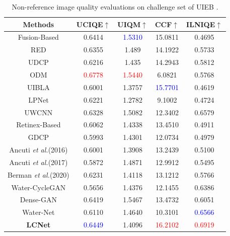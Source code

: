 \documentclass[journal]{IEEEtran}
\begin{document}
\begin{table}[h]
 \caption{Non-reference image quality evaluations on challenge set of UIEB \cite{water-net}. }
\centering

\begin{tabular}{|c|c|c|c|c|} 
\hline 
Methods&UCIQE\(\uparrow\)&UIQM\(\uparrow\)&CCF\(\uparrow\)&ILNIQE\(\uparrow\)\\
\hline
Fusion-Based \cite{fusion-based}&0.6414&\textcolor{blue}{1.5310}&15.0811&0.4695 \\
\hline
RED \cite{RED} &0.6355&1.489&14.1922&0.5733 \\
\hline 
UDCP \cite{UDCP} &0.6216&1.435&14.2943&0.5812 \\
\hline 
ODM \cite{Histogram-prior} &\textcolor{red}{0.6778}&\textcolor{red}{1.5440}&6.0821&0.5768\\
\hline
UIBLA \cite{blurriness-based} &0.6001&1.3757&\textcolor{blue}{15.7701}&0.4619\\
\hline
LPNet \cite{fu2019lightweight} &0.6221&1.2782&9.1002&0.4724\\
\hline
UWCNN \cite{uwcnn} &0.6328&1.5082&12.3402&0.6579\\
\hline
Retinex-Based \cite{fu2014retinex} &0.6062&1.4338&13.4510&0.4911\\
\hline
GDCP \cite{GDCP}&0.5993 &1.4301&12.0734&0.4979 \\
\hline
Ancuti \textit{et al.}(2016) \cite{ancuti2016multi} &0.6001 &1.3908&13.2439&0.5100 \\
\hline
Ancuti \textit{et al.}(2017) \cite{ancuti2017color} &0.5872 &1.4871&12.9912&0.5495 \\
\hline
Berman \textit{et al.}(2020) \cite{berman2020underwater} &0.6231 &1.4118&13.1212&0.5766 \\
\hline
Water-CycleGAN \cite{water-gan} &0.5656&1.4376&12.1455&0.6386\\
\hline
Dense-GAN \cite{dense-gan} & 0.6419&1.5467&13.4732&0.6051\\
\hline
Water-Net \cite{water-net} &0.6110&1.4640&10.3101&\textcolor{blue}{0.6566}
\\
\hline
\textbf{LCNet}&\textcolor{blue}{0.6449} &1.4096&\textcolor{red}{16.2102}&\textcolor{red}{0.6919}
\\
\hline 
\end{tabular}
\label{tab4} 
\end{table}
\end{document}
